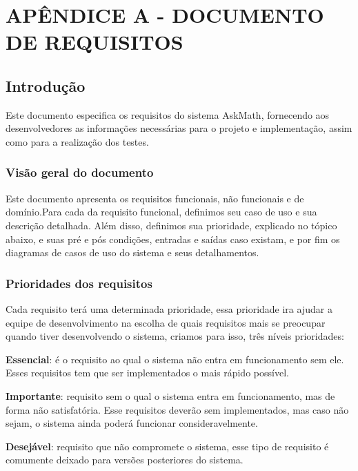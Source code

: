 \chapter*{APÊNDICE A - DOCUMENTO DE REQUISITOS}\label{apendice_requisitos}


\section{Introdução}
Este documento especifica os requisitos do sistema AskMath, fornecendo aos desenvolvedores as informações necessárias para o projeto e implementação, assim como para a realização dos testes. 

\subsection{Visão geral do documento}
Este documento apresenta os requisitos funcionais, n\~ao funcionais e de domínio.Para cada da requisito funcional, definimos seu caso de uso e sua descrição detalhada. Além disso, definimos sua 
prioridade, explicado no tópico abaixo, e suas pré e pós condições, entradas e saídas caso existam, e por fim os diagramas de casos de uso do sistema e seus detalhamentos.

\subsection{Prioridades dos requisitos}
Cada requisito terá uma determinada prioridade, essa prioridade ira ajudar a equipe de desenvolvimento na escolha de quais requisitos mais se preocupar quando tiver desenvolvendo o sistema, criamos para isso, três níveis prioridades:

\begin{alineascomponto}
	\item \textbf{Essencial}: é o requisito ao qual o sistema não entra em funcionamento sem ele. Esses requisitos tem que ser implementados o mais rápido possível. 
    \item \textbf{Importante}: requisito sem o qual o sistema entra em funcionamento, mas de forma não satisfatória. Esse requisitos deverão sem implementados, mas caso não sejam, o sistema ainda 
poderá funcionar consideravelmente.
	\item \textbf{Desejável}: requisito que não compromete o sistema, esse tipo de requisito é comumente deixado para versões posteriores do sistema.
\end{alineascomponto}

